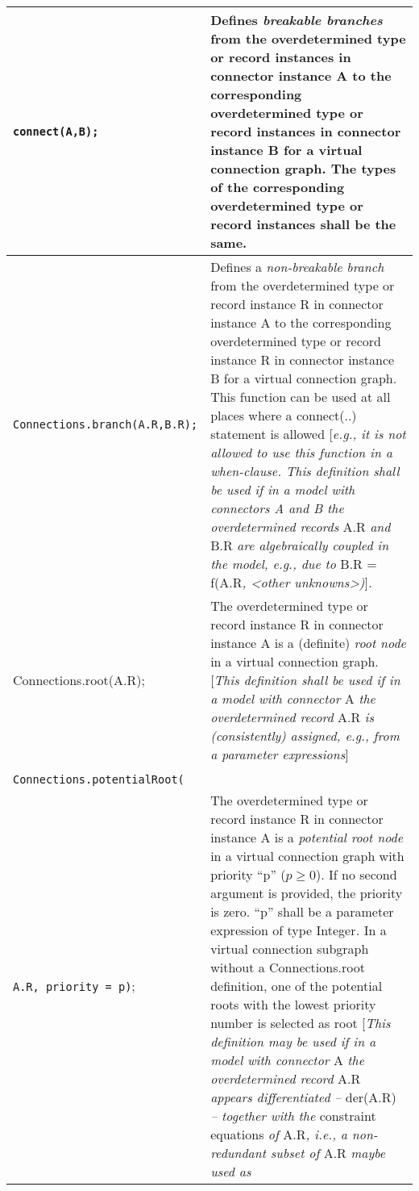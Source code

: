 \begin{longtable}[]{|p{5.1cm}|p{10cm}|}
\hline \endhead
\lstinline!connect(A,B);! & Defines \emph{breakable branches} from the
overdetermined type or record instances in connector instance A to the
corresponding overdetermined type or record instances in connector
instance B for a virtual connection graph. The types of the
corresponding overdetermined type or record instances shall be the
same.\\ \hline
\lstinline!Connections.branch(A.R,B.R);! & Defines a \emph{non-breakable branch}
from the overdetermined type or record instance R in connector instance
A to the corresponding overdetermined type or record instance R in
connector instance B for a virtual connection graph. This function can
be used at all places where a connect(..) statement is allowed
{[}\emph{e.g., it is not allowed to use this function in a when-clause.
This definition shall be used if in a model with connectors A and B the
overdetermined records} A.R \emph{and} B.R \emph{are algebraically
coupled in the model, e.g., due to} B.R = f(A.R\emph{, \textless{}other
unknowns\textgreater{})}{]}\emph{.}\\ \hline
Connections.root(A.R); & The overdetermined type or record instance R in
connector instance A is a (definite) \emph{root node} in a virtual
connection graph. {[}\emph{This definition shall be used if in a model
with connector} A \emph{the overdetermined record} A.R \emph{is
(consistently) assigned, e.g., from a parameter
expressions}{]}\\ \hline
\begin{tabular}{@{}p{5.1cm}@{}}
\lstinline!Connections.potentialRoot(A.R);!\\
\lstinline!Connections.potentialRoot(!\\
\lstinline!A.R, priority = p)!;
\end{tabular}
& The overdetermined type or record instance R in connector instance A is
a \emph{potential root node} in a virtual connection graph with priority
``p'' ($p\ge 0$). If no second argument is provided, the priority is zero.
``p'' shall be a parameter expression of type Integer\emph{.} In a
virtual connection subgraph without a Connections.root definition, one
of the potential roots with the lowest priority number is selected as
root {[}\emph{This definition may be used if in a model with connector}
A \emph{the overdetermined record} A.R \emph{appears differentiated --}
der(A.R) \emph{-- together with the} constraint equations \emph{of}
A.R\emph{, i.e., a non-redundant subset of} A.R \emph{maybe used as
}
\end{longtable}

